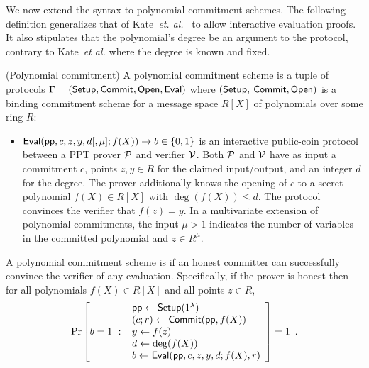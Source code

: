 We now extend the syntax to polynomial commitment schemes. The following definition generalizes that of Kate~\emph{et. al.}~\cite{AC:KatZavGol10} to allow interactive evaluation proofs. It also stipulates that the polynomial's degree be an argument to the protocol, contrary to Kate~\emph{et al.} where the degree is known and fixed.

\begin{definition} (Polynomial commitment) 
A polynomial commitment scheme is a tuple of protocols $\Gamma = (\textsf{{Setup}}, \textsf{{Commit}}, \textsf{{Open}}, \textsf{{Eval}})$ where $(\textsf{{Setup}},$ $\textsf{{Commit}}, \textsf{{Open}})$ is a binding commitment scheme for a message space $R[X]$ of polynomials over some ring $R$: 

\begin{itemize}
    \item $\textsf{{Eval}}(\textsf{pp}, c, z, y, d[, \mu]; f(X)) \rightarrow b \in \{0, 1\}$ is an interactive public-coin protocol between a PPT prover $\mathcal{P}$ and verifier $\mathcal{V}$. Both $\mathcal{P}$ and $\mathcal{V}$ have as input a commitment $c$, points $z, y \in R$ for the claimed input/output, and an integer $d$ for the degree. The prover additionally knows the opening of $c$ to a secret polynomial $f(X) \in R[X]$ with $\deg(f(X)) \leq d$. The protocol convinces the verifier that $f(z) = y$. {In a multivariate extension of polynomial commitments, the input $\mu > 1$ indicates the number of variables in the committed polynomial} and $z \in R^\mu$.
   
\end{itemize}

A polynomial commitment scheme is  if an honest committer can successfully convince the verifier of any evaluation. Specifically, if the prover is honest then for all polynomials $f(X) \in R[X]$ and all points $z \in R$,
\[
    \Pr\left[b = 1 \ : \ \begin{array}{l}
        \textsf{pp} \gets \textsf{{Setup}}(1^\lambda) \\
        (c; r) \gets \textsf{{Commit}}(\textsf{pp}, f(X)) \\
        y \gets f(z) \\
        d \gets \deg(f(X)) \\
        b \gets \textsf{{Eval}}(\textsf{pp}, c, z, y, d; f(X), r) \\
    \end{array} \right] = 1 \enspace .
\]


\end{definition}
